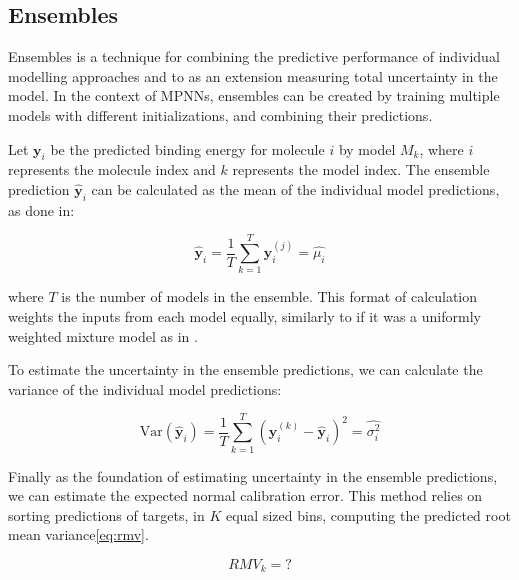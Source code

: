 \subsection{Ensembles}

Ensembles is a technique for combining the predictive performance of individual modelling approaches
and to as an extension measuring total uncertainty in the model.
In the context of MPNNs, ensembles can be created by training multiple models with different initializations,
and combining their predictions.

Let $\mathbf{y}_i$ be the predicted binding energy for molecule $i$ by model $M_k$, where $i$ represents the molecule index and $k$
represents the model index. The ensemble prediction $\hat{\mathbf{y}}_i$ can be calculated as the mean of the individual
model predictions, as done in\cite{Tran2019}:

\begin{equation}\label{eq:mean-ensemble}
    \hat{\mathbf{y}}_i = \frac{1}{T} \sum_{k=1}^T \mathbf{y}_i^{(j)} = \hat{\mu_{i}}
\end{equation}

where $T$ is the number of models in the ensemble. This format of calculation weights the inputs from each model equally,
similarly to if it was a uniformly weighted mixture model as in \cite{Busk2021}.

To estimate the uncertainty in the ensemble predictions, we can calculate the variance of the individual model
predictions\cite{Tran2019}:

\begin{equation}\label{eq:variance-ensemble}
    \text{Var}(\hat{\mathbf{y}}_i) = \frac{1}{T} \sum_{k=1}^T (\mathbf{y}_i^{(k)} - \hat{\mathbf{y}}_i)^2 = \hat{\sigma^{2}_{i}}
\end{equation}


Finally as the foundation of estimating uncertainty in the ensemble predictions, we can estimate the expected normal calibration error.
This method relies on sorting predictions of targets, in $K$ equal sized bins, computing the predicted root mean variance\ref{eq:rmv}.

\begin{equation}\label{eq:rmv}
    RMV_{k} = ?
\end{equation}

